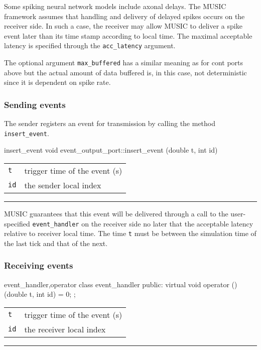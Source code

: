 \documentclass[a4paper,twoside]{report}
\makeatletter
\newenvironment{parameters}%
{\begin{tabular}{@{\hspace{2em}}lp{0.6\textwidth}}}%
{\end{tabular}\par\vspace{1mm}\par\hrule\par\vspace{5mm}}
\makeatother
\begin{document}
Some spiking neural network models include axonal delays.  The MUSIC
framework assumes that handling and delivery of delayed spikes occurs
on the receiver side.  In such a case, the receiver may allow MUSIC to
deliver a spike event later than its time stamp according to local
time.  The maximal acceptable latency is specified through the
\lstinline|acc_latency| argument.

The optional argument \lstinline|max_buffered|
has a similar meaning as for cont ports above but the actual amount
of data buffered is, in this case, not deterministic since it is
dependent on spike rate.

\subsubsection{Sending events}

The sender registers an event for transmission by calling the method
\lstinline|insert_event|.

\begin{head}{insert_event}
  void event_output_port::insert_event (double t, int id)
\end{head}
\begin{parameters}
  \lstinline|t| & trigger time of the event (s) \\
  \lstinline|id| & the sender local index \\
\end{parameters}

MUSIC guarantees that this event will be delivered through a call to
the user-specified \lstinline|event_handler| on the receiver side no
later that the acceptable latency relative to receiver local time.
The time \lstinline|t| must be between the simulation time of the last
tick and that of the next.


\subsubsection{Receiving events}

\begin{head}{event_handler,operator}
  class event_handler {
  public:
    virtual void operator () (double t, int id) = 0;
  };
\end{head}
\begin{parameters}
  \lstinline|t| & trigger time of the event (s) \\
  \lstinline|id| & the receiver local index \\
\end{parameters}
\end{document}
